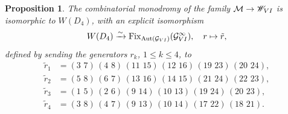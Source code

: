 \documentclass[10pt,a4paper]{amsart}
\newtheorem{proposition}{Proposition}
\begin{document}
\begin{proposition} \label{prop:combinatorialmonodromyPVI}
The combinatorial monodromy of the family $\mathcal{M}\to\mathscr{W}_{\rm{VI}}$ is isomorphic to $W(D_4)$, with an explicit isomorphism 
    \begin{equation*}
     W(D_4)\xrightarrow{\sim}   \operatorname{Fix}_{\operatorname{Aut}(\mathcal{G}_{\rm{VI}})}(\mathcal{G}_{\rm{VI}}^\infty), \quad r\mapsto \tilde{r},
    \end{equation*}
defined by sending the generators $r_k$, $1\leq k\leq 4$, to
\begin{align*}
	\tilde{r}_1&=(3\,\, 7)\,(4\, \, 8)\,(11\,\, 15)\,(12\,\, 16)\,(19\,\, 23)\,(20\,\, 24),\\
	\tilde{r}_2&=(5\,\, 8)\,(6\, \, 7)\,(13\,\, 16)\,(14\,\, 15)\,(21\,\, 24)\,(22\,\, 23),\\
	\tilde{r}_3&=(1\,\, 5)\,(2\, \, 6)\,(9\,\, 14)\,(10\,\, 13)\,(19\,\, 24)\,(20\,\, 23),\\
	\tilde{r}_4&=(3\,\, 8)\,(4\, \, 7)\,(9\,\, 13)\,(10\,\, 14)\,(17\,\, 22)\,(18\,\, 21).
\end{align*}
\end{proposition}
\end{document}
